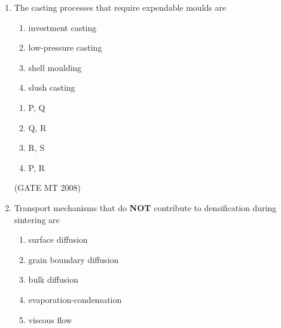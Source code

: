 \documentclass[11pt, letterpaper]{article}
\theoremstyle{remark}
\begin{document}
\begin{enumerate}
\begin{enumerate}[label=(\MakeUppercase{\alph*}), start= 16]
\item The reaction will shift to left on increasing T
\item The reaction will shift to right on increasing T
\item The reaction will shift to left on increasing pressure
\item The reaction will shift to right on increasing pressure
\end{enumerate}

\begin{multicols}{2}
\begin{enumerate} 
\item P, S
\item P, Q
\item Q, R
\item R, S
\end{enumerate}
\end{multicols}
\hfill(GATE MT 2008)

\item The casting processes that require expendable moulds are
\begin{multicols}{1}
\begin{enumerate}[label=(\MakeUppercase{\alph*}), start= 16]
\item investment casting
\item low-pressure casting
\item shell moulding
\item slush casting
\end{enumerate}
\end{multicols}

\begin{multicols}{2}
\begin{enumerate} 
\item P, Q
\item Q, R
\item R, S
\item P, R
\end{enumerate}
\end{multicols}
\hfill(GATE MT 2008)
\item Transport mechanisms that do \textbf{NOT} contribute to densification during sintering are
\begin{enumerate}[label=(\MakeUppercase{\alph*}), start= 16]
\item surface diffusion
\item grain boundary diffusion
\item bulk diffusion
\item evaporation-condensation
\item viscous flow
\end{enumerate}


\end{enumerate}
\end{document}
